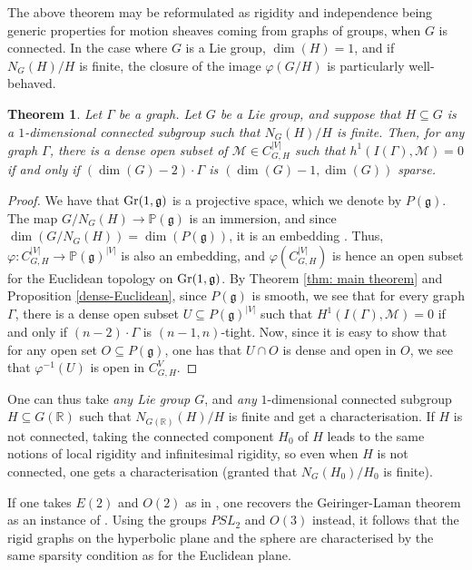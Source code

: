 \documentclass{article}
\newtheorem{theorem}{Theorem}[section]
\theoremstyle{definition}
\theoremstyle{remark}
\begin{document}
The above theorem may be reformulated as rigidity and independence being generic properties for motion sheaves coming from graphs of groups, when $G$ is connected.
In the case where $G$ is a Lie group, $\dim(H)=1$, and if $N_{G}(H)/H$ is finite, the closure of the image $\varphi(G/H)$ is particularly well-behaved. 

\begin{theorem}\label{cor: main - thm}
    Let $\Gamma$ be a graph. Let $G$ be a Lie group, and suppose that $H\subseteq G$ is a $1$-dimensional connected subgroup such that $N_{G}(H)/H$ is finite. Then, for any graph $\Gamma$, there is a dense open subset of $\mathcal{M} \in C_{G, H}^{|V|}$ such that $h^{1}(I(\Gamma), \mathcal{M}) = 0$ if and only if $(\dim(G) -2)\cdot \Gamma$ is $(\dim(G) - 1, \dim(G))$ sparse.
\end{theorem}
\begin{proof}
    We have that $\textup{Gr}(1, \mathfrak{g})$ is a projective space, which we denote by $P(\mathfrak{g})$. The map $G/N_{G}(H) \rightarrow \mathbb{P}(\mathfrak{g})$ is an immersion, and since $\dim( G/N_{G}(H)) = \dim(P(\mathfrak{g}))$, it is an embedding \cite[Proposition 5.21(a)]{Lee}. Thus, $\varphi: C_{G, H}^{|V|}\rightarrow \mathbb{P}(\mathfrak{g})^{|V|}$ is also an embedding, and $\varphi(C_{G,H}^{|V|})$ is hence an open subset for the Euclidean topology on $\textup{Gr}(1, \mathfrak{g})$. By Theorem \ref{thm: main theorem} and Proposition \ref{dense-Euclidean}, since $P(\mathfrak{g})$ is smooth, we see that for every graph $\Gamma$, there is a dense open subset $U\subseteq P(\mathfrak{g})^{|V|}$ such that $H^{1}(I(\Gamma), \mathcal{M}) = 0$ if and only if $(n-2)\cdot \Gamma$ is $(n-1, n)$-tight. Now, since it is easy to show that for any open set $O\subseteq P(\mathfrak{g})$, one has that $U\cap O$ is dense and open in $O$, we see that $\varphi^{-1}(U)$ is open in $C_{G, H}^{V}$. 
\end{proof}


One can thus take \textit{any Lie group $G$}, and \textit{any} $1$-dimensional connected subgroup $H \subseteq G(\mathbb{R})$ such that $N_{G(\mathbb{R})}(H)/H$ is finite and get a characterisation. If $H$ is not connected, taking the connected component $H_0$ of $H$ leads to the same notions of local rigidity and infinitesimal rigidity, so even when $H$ is not connected, one gets a characterisation (granted that $N_G(H_0)/H_0$ is finite).

If one takes $E(2)$ and $O(2)$ as in , one recovers the Geiringer-Laman theorem as an instance of . Using the groups $PSL_{2}$ and $O(3)$ instead, it follows that the rigid graphs on the hyperbolic plane and the sphere are characterised by the same sparsity condition as for the Euclidean plane. 
\end{document}
